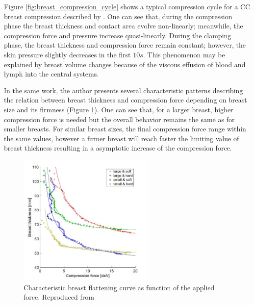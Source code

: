 Figure \ref{fig:breast_compression_cycle} shows a typical compression cycle for a CC breast compression described by \cite{de_pain_2015}. One can see that, during the compression phase the breast thickness and contact area evolve non-linearly; meanwhile, the compression force and pressure increase quasi-linearly. During the clamping phase, the breast thickness and compression force remain constant; however, the skin pressure slightly decreases in the first $10s$. This  phenomenon may be explained by breast volume changes because of the viscous effusion of blood and lymph into the central systems. 

In the same work, the author presents several characteristic patterns  describing the relation between breast thickness and compression force depending on breast size and its firmness (Figure \ref{fig:thickness_force_patterns_groot}). One can see that, for a larger breast, higher compression force is needed but the overall behavior remains the same as for smaller breasts. For similar breast sizes, the final compression force range within the same values, however a firmer breast will reach faster the limiting value of breast thickness resulting in a asymptotic increase of the compression force.
\begin{figure}[!h]
\centering
\includegraphics[width=0.6\textwidth,keepaspectratio]{figures/thickness_force_patterns_groot.jpg} 
\caption{Characteristic breast flattening curve as function of the applied force. Reproduced from \cite{groot_towards_2015}}\label{fig:thickness_force_patterns_groot}
\end{figure}

